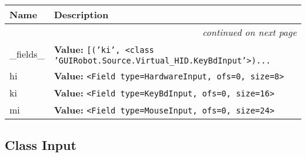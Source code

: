     \vspace{-1cm}
\hspace{\varindent}\begin{longtable}{|p{\varnamewidth}|p{\vardescrwidth}|l}
\cline{1-2}
\cline{1-2} \centering \textbf{Name} & \centering \textbf{Description}& \\
\cline{1-2}
\endhead\cline{1-2}\multicolumn{3}{r}{\small\textit{continued on next page}}\\\endfoot\cline{1-2}
\endlastfoot\raggedright \_\-f\-i\-e\-l\-d\-s\-\_\- & \raggedright \textbf{Value:} 
{\tt \texttt{[}\texttt{(}\texttt{'}\texttt{ki}\texttt{'}\texttt{, }{\textless}class 'GUIRobot.Source.Virtual\_HID.KeyBdInput'{\textgreater}\texttt{)}\texttt{...}}&\\
\cline{1-2}
\raggedright h\-i\- & \raggedright \textbf{Value:} 
{\tt {\textless}Field type=HardwareInput, ofs=0, size=8{\textgreater}}&\\
\cline{1-2}
\raggedright k\-i\- & \raggedright \textbf{Value:} 
{\tt {\textless}Field type=KeyBdInput, ofs=0, size=16{\textgreater}}&\\
\cline{1-2}
\raggedright m\-i\- & \raggedright \textbf{Value:} 
{\tt {\textless}Field type=MouseInput, ofs=0, size=24{\textgreater}}&\\
\cline{1-2}
\end{longtable}



\subsection{Class Input}

